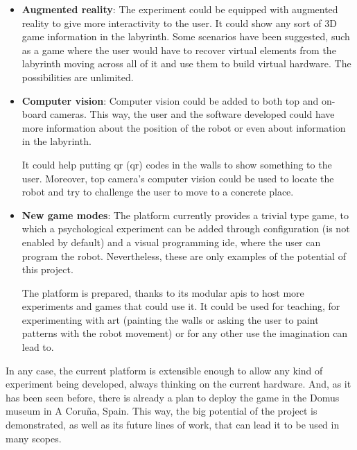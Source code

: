 \begin{itemize}

	\item \textbf{Augmented reality}: The experiment could be equipped with augmented reality to
	give more interactivity to the user. It could show any sort of 3D game information in the
	labyrinth. Some scenarios have been suggested, such as a game where the user would have to
	recover virtual elements from the labyrinth moving across all of it and use them to build
	virtual hardware. The possibilities are unlimited.

	\item \textbf{Computer vision}: Computer vision could be added to both top and on-board cameras.
	This way, the user and the software developed could have more information about the position of
	the robot or even about information in the labyrinth.

	It could help putting \acrshort{qr}  (\acrlong{qr}) codes in the walls to show something to the
	user. Moreover, top camera's computer vision could be used to locate the robot and try to
	challenge the user to move to a concrete place.

	\item \textbf{New game modes}: The platform currently provides a trivial type game, to which a
	psychological experiment can be added through configuration (is not enabled by default) and a
	visual programming \acrshort{ide}, where the user can program the robot. Nevertheless, these are
	only examples of the potential of this project.

	The platform is prepared, thanks to its modular \acrshort{api}s to host more experiments and
	games that could use it. It could be used for teaching, for experimenting with art (painting the
	walls or asking the user to paint patterns with the robot movement) or for any other use the
	imagination can lead to.

\end{itemize}

In any case, the current platform is extensible enough to allow any kind of experiment being
developed, always thinking on the current hardware. And, as it has been seen before, there is
already a plan to deploy the game in the Domus museum in A Coruña, Spain. This way, the big
potential of the project is demonstrated, as well as its future lines of work, that can lead it to
be used in many scopes.
